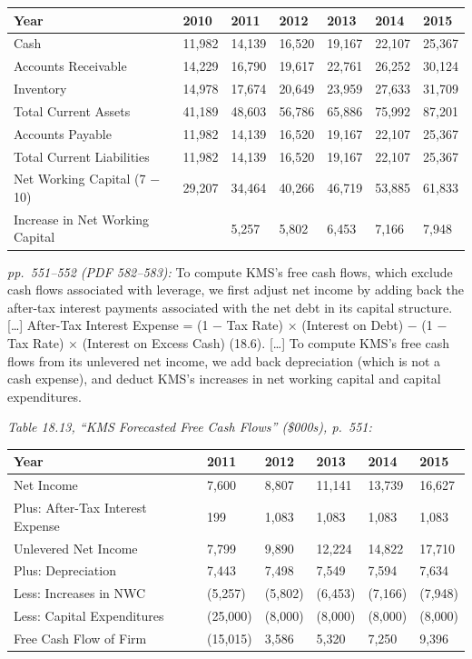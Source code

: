 \documentclass[11pt,a4paper]{article}
\begin{document}
{\def\LTcaptype{none} %
\begin{longtable}[]{@{}lllllll@{}}
\toprule\noalign{}
Year & 2010 & 2011 & 2012 & 2013 & 2014 & 2015 \\
\midrule\noalign{}
\endhead
\bottomrule\noalign{}
\endlastfoot
Cash & 11,982 & 14,139 & 16,520 & 19,167 & 22,107 & 25,367 \\
Accounts Receivable & 14,229 & 16,790 & 19,617 & 22,761 & 26,252 & 30,124 \\
Inventory & 14,978 & 17,674 & 20,649 & 23,959 & 27,633 & 31,709 \\
Total Current Assets & 41,189 & 48,603 & 56,786 & 65,886 & 75,992 & 87,201 \\
Accounts Payable & 11,982 & 14,139 & 16,520 & 19,167 & 22,107 & 25,367 \\
Total Current Liabilities & 11,982 & 14,139 & 16,520 & 19,167 & 22,107 & 25,367 \\
Net Working Capital (7 − 10) & 29,207 & 34,464 & 40,266 & 46,719 & 53,885 & 61,833 \\
Increase in Net Working Capital & & 5,257 & 5,802 & 6,453 & 7,166 & 7,948 \\
\end{longtable}
}

\emph{pp.~551--552 (PDF 582--583):} To compute KMS's free cash flows, which exclude cash flows
associated with leverage, we first adjust net income by adding back the after-tax interest payments
associated with the net debt in its capital structure. {[}\ldots{]} After-Tax Interest Expense = (1
− Tax Rate) × (Interest on Debt) − (1 − Tax Rate) × (Interest on Excess Cash) (18.6). {[}\ldots{]}
To compute KMS's free cash flows from its unlevered net income, we add back depreciation (which is
not a cash expense), and deduct KMS's increases in net working capital and capital expenditures.

\emph{Table 18.13, ``KMS Forecasted Free Cash Flows'' (\$000s), p.~551:}

{\def\LTcaptype{none} %
\begin{longtable}[]{@{}llllll@{}}
\toprule\noalign{}
Year & 2011 & 2012 & 2013 & 2014 & 2015 \\
\midrule\noalign{}
\endhead
\bottomrule\noalign{}
\endlastfoot
Net Income & 7,600 & 8,807 & 11,141 & 13,739 & 16,627 \\
Plus: After-Tax Interest Expense & 199 & 1,083 & 1,083 & 1,083 & 1,083 \\
Unlevered Net Income & 7,799 & 9,890 & 12,224 & 14,822 & 17,710 \\
Plus: Depreciation & 7,443 & 7,498 & 7,549 & 7,594 & 7,634 \\
Less: Increases in NWC & (5,257) & (5,802) & (6,453) & (7,166) & (7,948) \\
Less: Capital Expenditures & (25,000) & (8,000) & (8,000) & (8,000) & (8,000) \\
Free Cash Flow of Firm & (15,015) & 3,586 & 5,320 & 7,250 & 9,396 \\
\end{longtable}
}
\end{document}
